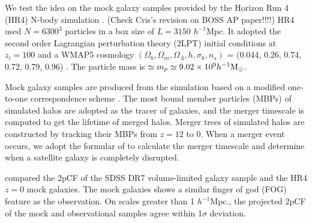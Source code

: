 \documentclass[iop]{emulateapj}
\newcommand{\hMsun}{{\ifmmode{h^{-1}{\rm
        {M_{\odot}}}}\else{$h^{-1}{\rm{M_{\odot}}}$~}\fi}}
\begin{document}
We test the idea on the mock galaxy samples provided by the Horizon Run 4  (HR4) N-body simulation \citep{hr4}.
(Check Cris's revision on BOSS AP paper!!!!)
HR4 used $N=6300^3$ particles in a box size of $L={3150}$ $h^{-1}$Mpc.  
It adopted the second order Lagrangian perturbation theory (2LPT) initial conditions at $z_{i}=100$
and a WMAP5 cosmology $(\Omega_{b},\Omega_{m},\Omega_\Lambda,h,\sigma_8,n_s)$  = (0.044, 0.26, 0.74, 0.72, 0.79, 0.96) \citep[]{komatsu 2011}.
The particle mass is $\simeq m_{p} \simeq 9.02 \times 10^9 \hMsun$.

Mock galaxy samples are produced from the simulation based on a modified one-to-one correspondence scheme \citep{hong2016}. 
The most bound member particles (MBPs) of simulated halos are adopted as the tracer of galaxies,
and the merger timescale is computed to get the lifetime of merged halos.
Merger trees of simulated halos are constructed by tracking their MBPs from $z = 12$ to 0.
When a merger event occurs, we adopt the formular of \cite{jiang2008} to calculate the merger timescale 
and determine when a satellite galaxy is completely disrupted.

\cite{hong2016} compared the 2pCF of the SDSS DR7 volume-limited galaxy sample \citep{zehavi2011} and the HR4 $z=0$ mock galaxies.
The mock galaxies shows a similar finger of god (FOG) feature \citep{FOG} as the observation.
On scales greater than 1 ${h^{-1}}$Mpc., 
the projected 2pCF of the mock and observational samples agree within 1$\sigma$ deviation.
\end{document}
